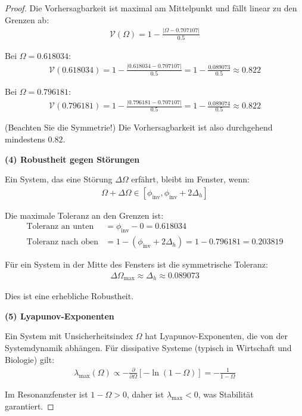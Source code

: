\documentclass[a4paper, 12pt, twoside, openright]{report}
\theoremstyle{definition}
\theoremstyle{definition}
\begin{document}
\begin{proof}
Die Vorhersagbarkeit ist maximal am Mittelpunkt und fällt linear zu den Grenzen ab:
\begin{align}
\mathcal{V}(\Omega) = 1 - \frac{|\Omega - 0.707107|}{0.5}
\end{align}

Bei $\Omega = 0.618034$:
\begin{align}
\mathcal{V}(0.618034) = 1 - \frac{|0.618034 - 0.707107|}{0.5} = 1 - \frac{0.089073}{0.5} \approx 0.822
\end{align}

Bei $\Omega = 0.796181$:
\begin{align}
\mathcal{V}(0.796181) = 1 - \frac{|0.796181 - 0.707107|}{0.5} = 1 - \frac{0.089074}{0.5} \approx 0.822
\end{align}

(Beachten Sie die Symmetrie!) Die Vorhersagbarkeit ist also durchgehend mindestens $0.82$.

\textbf{(4) Robustheit gegen Störungen}

Ein System, das eine Störung $\Delta\Omega$ erfährt, bleibt im Fenster, wenn:
\begin{align}
\Omega + \Delta\Omega \in [\phi_{\text{inv}}, \phi_{\text{inv}} + 2\Delta_h]
\end{align}

Die maximale Toleranz an den Grenzen ist:
\begin{align}
\text{Toleranz an unten} &= \phi_{\text{inv}} - 0 = 0.618034 \\
\text{Toleranz nach oben} &= 1 - (\phi_{\text{inv}} + 2\Delta_h) = 1 - 0.796181 = 0.203819
\end{align}

Für ein System in der Mitte des Fensters ist die symmetrische Toleranz:
\begin{align}
\Delta\Omega_{\text{max}} \approx \Delta_h \approx 0.089073
\end{align}

Dies ist eine erhebliche Robustheit.

\textbf{(5) Lyapunov-Exponenten}

Ein System mit Unsicherheitsindex $\Omega$ hat Lyapunov-Exponenten, die von der Systemdynamik abhängen. Für dissipative Systeme (typisch in Wirtschaft und Biologie) gilt:
\begin{align}
\lambda_{\text{max}}(\Omega) \propto -\frac{\partial}{\partial \Omega}[-\ln(1-\Omega)] = -\frac{1}{1-\Omega}
\end{align}

Im Resonanzfenster ist $1 - \Omega > 0$, daher ist $\lambda_{\text{max}} < 0$, was Stabilität garantiert.

\end{proof}
\end{document}
